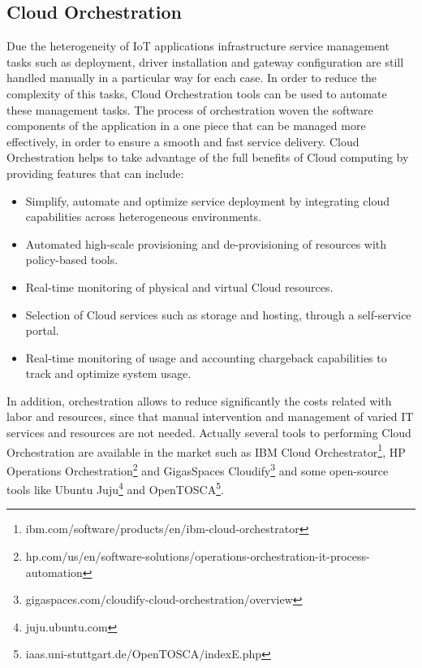 \subsection{Cloud Orchestration}
\label{sub:cloud_orchestration}
Due the heterogeneity of IoT applications infrastructure service management tasks such as deployment, driver installation and gateway configuration are still handled manually in a particular way for each case.
In order to reduce the complexity of this tasks, Cloud Orchestration tools can be used to automate these management tasks. The process of orchestration woven the software components of the application
in a one piece that can be managed more effectively, in order to ensure a smooth and fast service delivery. Cloud Orchestration helps to take advantage of the full benefits of Cloud computing by providing features that can include:
\begin{itemize}
  \item Simplify, automate and optimize service deployment by integrating cloud capabilities across heterogeneous environments.
  \item Automated high-scale provisioning and de-provisioning of resources with policy-based tools.
  \item Real-time monitoring of physical and virtual Cloud resources.
  \item Selection of Cloud services such as storage and hosting, through a self-service portal.
  \item Real-time monitoring of usage and accounting chargeback capabilities to track and optimize system usage.
\end{itemize}
In addition, orchestration allows to reduce significantly the costs related with labor and resources, since that manual intervention and management of varied IT services and resources are not needed. Actually several tools to
performing Cloud Orchestration are available in the market such as IBM Cloud Orchestrator\footnote{ibm.com/software/products/en/ibm-cloud-orchestrator}, HP Operations Orchestration\footnote{hp.com/us/en/software-solutions/operations-orchestration-it-process-automation}
and GigasSpaces Cloudify\footnote{gigaspaces.com/cloudify-cloud-orchestration/overview} and some open-source tools like Ubuntu Juju\footnote{juju.ubuntu.com} and OpenTOSCA\footnote{iaas.uni-stuttgart.de/OpenTOSCA/indexE.php}.
